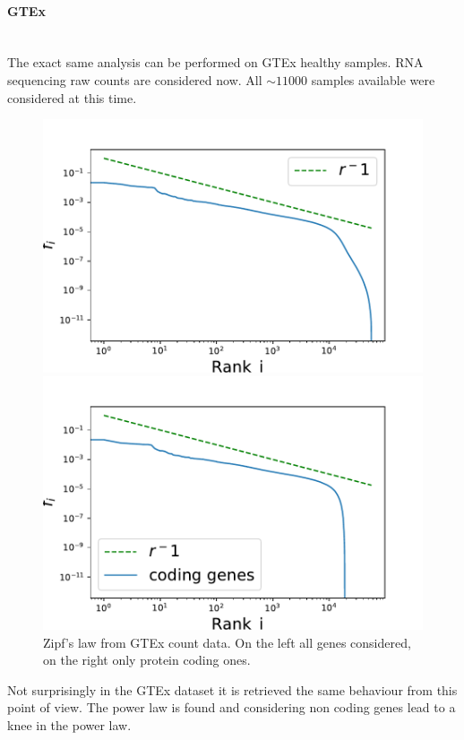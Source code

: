 \paragraph{GTEx}\mbox{} \\
The exact same analysis can be performed on GTEx healthy samples. RNA sequencing raw counts are considered now. All $\sim11000$ samples available were considered at this time.
\begin{figure}[htb!]
    \centering
    \begin{minipage}{0.45\textwidth}
    \includegraphics[width=0.95\linewidth]{pictures/structure/gtex/globalZipf.pdf}
    \end{minipage}
    \hspace{2mm}
    \begin{minipage}{0.45\textwidth}
    \includegraphics[width=0.95\linewidth]{pictures/structure/gtex/globalZipf_c.pdf}
    \end{minipage}
    \caption{Zipf's law from GTEx count data. On the left all genes considered, on the right only protein coding ones.}
    \label{fig:my_label}
\end{figure}
Not surprisingly in the GTEx dataset it is retrieved the same behaviour from this point of view. The power law is found and considering non coding genes lead to a knee in the power law.

